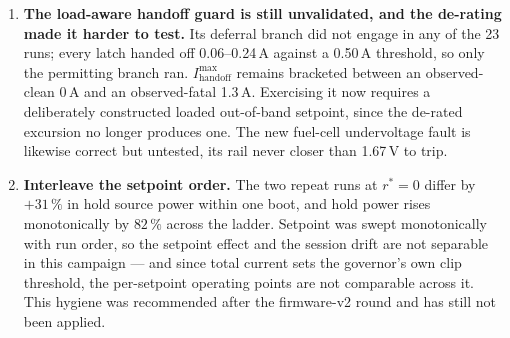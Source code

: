 \documentclass[11pt]{article}
\begin{document}
\begin{enumerate}
under-determines the outcome and the discriminator is the sub-millisecond ripple
depth. The blocking measurement is unchanged: LM1084 input and output probed
together through a truncation.
\item \textbf{The load-aware handoff guard is still unvalidated, and the
de-rating made it harder to test.} Its deferral branch did not engage in any of
the 23 runs; every latch handed off 0.06--0.24\,A against a 0.50\,A threshold, so
only the permitting branch ran. $I_\mathrm{handoff}^{\max}$ remains bracketed
between an observed-clean 0\,A and an observed-fatal 1.3\,A. Exercising it now
requires a deliberately constructed loaded out-of-band setpoint, since the
de-rated excursion no longer produces one. The new fuel-cell undervoltage fault
is likewise correct but untested, its rail never closer than 1.67\,V to trip.
\item \textbf{Interleave the setpoint order.} The two repeat runs at $r^\ast=0$
differ by $+31\,\%$ in hold source power within one boot, and hold power rises
monotonically by $82\,\%$ across the ladder. Setpoint was swept monotonically
with run order, so the setpoint effect and the session drift are not separable in
this campaign --- and since total current sets the governor's own clip threshold,
the per-setpoint operating points are not comparable across it. This hygiene was
recommended after the firmware-v2 round and has still not been applied.
\end{enumerate}
\end{document}
